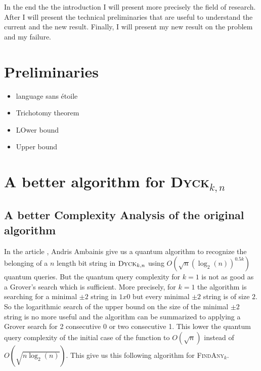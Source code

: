 \documentclass[11pt,a4paper]{article}
\newcommand{\Dyck}[1]{\textsc{Dyck$_{#1}$}}
\newcommand{\FA}[1]{\textsc{FindAny$_{#1}$}}
\theoremstyle{definition}
\theoremstyle{plain}
\theoremstyle{definition}
\begin{document}
In the end the the introduction I will present more precisely the field of research.
After I will present the technical preliminaries that are useful to understand the
current and the new result. Finally, I will present my new result on the problem
and my failure.




\section{Preliminaries}

 {\color{red}
  \begin{itemize}
      \item language sans étoile
      \item Trichotomy theorem
      \item LOwer bound
      \item Upper bound
  \end{itemize}}



\section{A better algorithm for \Dyck{k,n}}

\subsection{A better Complexity Analysis of the original algorithm}

In the article \cite{art:2DGrid}, Andris Ambainis give us a quantum algorithm to recognize
the belonging of a $n$ length bit string in $\Dyck{k, n}$ using
$O(\sqrt{n}(\log_2(n))^{0.5k})$ quantum queries. But the quantum query complexity for $k=1$ is not as good as a
Grover's search which is sufficient. More precisely, for $k=1$ the algorithm is
searching for a minimal $\pm 2$ string in $1x0$ but every minimal $\pm 2$ string
is of size $2$. So the logarithmic search of the upper bound on the size of the
minimal $\pm 2$ string is no more useful and the algorithm can be summarized to
applying a Grover search for 2 consecutive 0 or two consecutive 1. This lower the quantum
query complexity of the initial case of the function to $O(\sqrt{n})$ instead of $O(\sqrt{n\log_2(n)})$.
This give us this following algorithm for \FA{k}.
\end{document}
